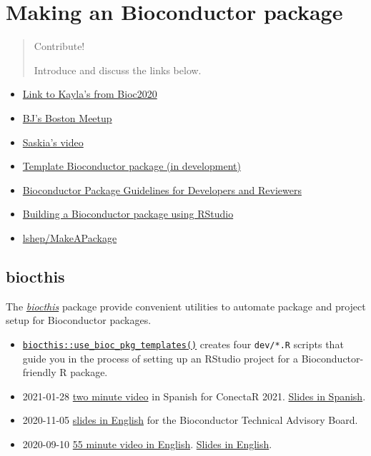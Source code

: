 \documentclass[
]{book}
\providecommand{\tightlist}{%
  \setlength{\itemsep}{0pt}\setlength{\parskip}{0pt}}
\begin{document}
\hypertarget{bioc-package}{%
\chapter{Making an Bioconductor package}\label{bioc-package}}

\begin{quote}
Contribute!

Introduce and discuss the links below.
\end{quote}

\begin{itemize}
\tightlist
\item
  \href{TODO}{Link to Kayla's from Bioc2020}
\item
  \href{TODO}{BJ's Boston Meetup}
\item
  \href{TODO}{Saskia's video}
\item
  \href{https://github.com/kevinrue/BiocPackageSofwareTemplate}{Template Bioconductor package (in development)}
\item
  \href{https://github.com/kevinrue/bioc_package_guide}{Bioconductor Package Guidelines for Developers and Reviewers}
\item
  \href{https://github.com/SaskiaFreytag/making_bioconductor_pkg}{Building a Bioconductor package using RStudio}
\item
  \href{https://github.com/lshep/MakeAPackage}{lshep/MakeAPackage}
\end{itemize}

\hypertarget{biocthis}{%
\section{biocthis}\label{biocthis}}

The \emph{\href{https://bioconductor.org/packages/3.13/biocthis}{biocthis}} package provide convenient utilities to automate package and project setup for Bioconductor packages.

\begin{itemize}
\tightlist
\item
  \href{https://lcolladotor.github.io/biocthis/reference/use_bioc_pkg_templates.html}{\texttt{biocthis::use\_bioc\_pkg\_templates()}} creates four \texttt{dev/*.R} scripts that guide you in the process of setting up an RStudio project for a Bioconductor-friendly R package.
\item
  2021-01-28 \href{https://youtu.be/3fLNsLchPnI}{two minute video} in Spanish for ConectaR 2021. \href{https://speakerdeck.com/lcolladotor/biocthis-conectar2021}{Slides in Spanish}.
\item
  2020-11-05 \href{https://speakerdeck.com/lcolladotor/biocthis-tab}{slides in English} for the Bioconductor Technical Advisory Board.
\item
  2020-09-10 \href{https://youtu.be/aMTxkYsM-8o}{55 minute video in English}. \href{https://speakerdeck.com/lcolladotor/making-bioc-packages-with-biocthis}{Slides in English}.
\end{itemize}
\end{document}
